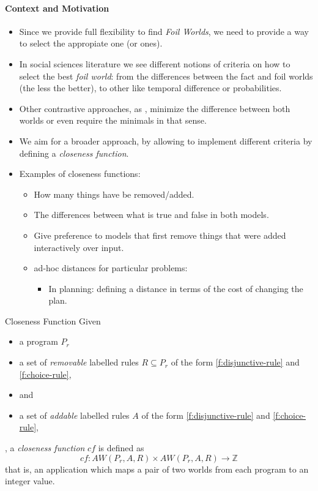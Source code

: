 \paragraph{Context and Motivation}
\begin{itemize}
  \item Since we provide full flexibility to find \emph{Foil Worlds}, we need to provide a way to select the appropiate one (or ones).
  \item In social sciences literature we see different notions of criteria on how to select the best \emph{foil world}: from the differences between the fact and foil worlds (the less the better), to other like temporal difference or probabilities.
  \item Other contrastive approaches, as \cite{eigeoe23a}, minimize the difference between both worlds or even require the minimals in that sense.
  \item We aim for a broader approach, by allowing to implement different criteria by defining a \emph{closeness function}.
  \item Examples of closeness functions:
  \begin{itemize}
    \item How many things have be removed/added.
    \item The differences between what is true and false in both models.
    \item Give preference to models that first remove things that were added interactively over input.
    \item ad-hoc distances for particular problems:
    \begin{itemize}
      \item In planning: defining a distance in terms of the cost of changing the plan.
    \end{itemize}
  \end{itemize}
\end{itemize}

\begin{definition}{Closeness Function}
  Given
  \begin{itemize}
    \item a program $P_r$
    \item a set of \emph{removable} labelled rules $R \subseteq P_r$ of the form \eqref{f:disjunctive-rule} and \eqref{f:choice-rule},
    \item and
    \item a set of \emph{addable} labelled rules $A$ of the form \eqref{f:disjunctive-rule} and \eqref{f:choice-rule},
  \end{itemize},
  a \emph{closeness function} $cf$ is defined as
  \[
  cf : AW(P_r, A, R) \times AW(P_r, A, R) \to \mathbb{Z}
  \]
  that is, an application which maps a pair of two worlds from each program to an integer value.
\end{definition}

